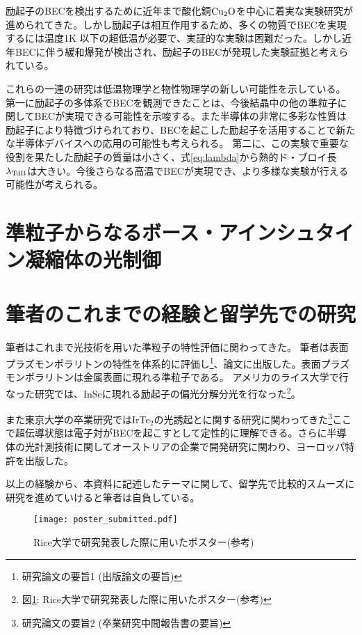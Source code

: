\documentclass[11pt,a4paper]{jsarticle}
\begin{document}
励起子のBECを検出するために近年まで酸化銅${\rm Cu_2O}$を中心に着実な実験研究が進められてきた\cite{David}。しかし励起子は相互作用するため、多くの物質でBECを実現するには温度1K 以下の超低温が必要で、実証的な実験は困難だった。しかし近年BECに伴う緩和爆発が検出され\cite{Yoshioka}、励起子のBECが発現した実験証拠と考えられている。

これらの一連の研究は低温物理学と物性物理学の新しい可能性を示している。
第一に励起子の多体系でBECを観測できたことは、今後結晶中の他の準粒子に関してBECが実現できる可能性を示唆する。また半導体の非常に多彩な性質は励起子により特徴づけられており、BECを起こした励起子を活用することで新たな半導体デバイスへの応用の可能性も考えられる。
第二に、この実験で重要な役割を果たした励起子の質量は小さく、式\ref{eq:lambda}から熱的ド・ブロイ長$\lambda_{\rm TdB}$は大きい。今後さらなる高温でBECが実現でき、より多様な実験が行える可能性が考えられる。

\section{準粒子からなるボース・アインシュタイン凝縮体の光制御}



\section{筆者のこれまでの経験と留学先での研究}
筆者はこれまで光技術を用いた準粒子の特性評価に関わってきた。
筆者は表面プラズモンポラリトンの特性を体系的に評価し\footnote{研究論文の要旨1 (出版論文の要旨)}、論文に出版した\cite{Hiramatsu}。表面プラズモンポラリトンは金属表面に現れる準粒子である。
アメリカのライス大学で行なった研究では、InSeに現れる励起子の偏光分解分光を行なった\footnote{ 図\ref{fig:poster}: Rice大学で研究発表した際に用いたポスター(参考)}。

また東京大学の卒業研究ではIrTe$_2$の光誘起とに関する研究に関わってきた\footnote{研究論文の要旨2 (卒業研究中間報告書の要旨)}ここで超伝導状態は電子対がBECを起こすとして定性的に理解できる。さらに半導体の光計測技術に関してオーストリアの企業で開発研究に関わり、ヨーロッパ特許を出版した\cite{Etschmaier}。

以上の経験から、本資料に記述したテーマに関して、留学先で比較的スムーズに研究を進めていけると筆者は自負している。

\begin{figure}[p]
  \begin{center}
   \texttt{[image: poster\_submitted.pdf]}
  \end{center}
  \caption{Rice大学で研究発表した際に用いたポスター(参考)}
  \label{fig:poster}
\end{figure}






\end{document}
